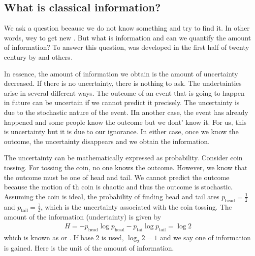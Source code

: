 \documentclass[letterpaper,10pt,english]{jupyterBook}
\begin{document}
\subsection{What is classical information?}
\label{\detokenize{computation/ccomp:what-is-classical-information}}
\sphinxAtStartPar
We  ask a question because we do not know something and try to find it.  In other words, wey to get new .  But what is information and can we quantify the amount of information?  To answer this question,  was developed in the first half of twenty century by  and others.

\sphinxAtStartPar
In essence,  the amount of information we obtain is the amount of uncertainty decreased.  If there is no uncertainty, there is nothing to ask.  The undertainties arise in several different ways.  The outcome of an event that is going to happen in future can be uncertain if we cannot predict it precisely.  The uncertainty is due to the stochastic nature of the event.  IIn another case, the event has already happened and some people know  the outcome but we dont’ know it.  For us, this is uncertainty but it is due to our ignorance.  In either case,  once we know the outcome, the uncertainty disappears and we obtain the information.

\sphinxAtStartPar
The uncertainty can be mathematically expressed as probability.  Consider coin tossing.  For tossing the coin, no one knows the outcome.  However, we know that the outcome must be one of head and tail.  We cannot predict the outcome because the motion of th coin is chaotic and thus the outcome is stochastic.  Assuming the coin is ideal, the probability of finding head and tail ares \(p_\text{head} = \frac{1}{2}\) and \(p_\text{tail}=\frac{1}{2}\), which is the uncertainty associated with the coin tossing.  The amount of the information (undertainty) is given by
\begin{equation*}
\begin{split}
H = - p_\text{head} \log p_\text{head} - p_\text{tai} \log p_\text{tail} = \log 2
\end{split}
\end{equation*}
\sphinxAtStartPar
which is known as  or .  If base 2 is used, \(\log_2 2 = 1\) and  we say one  of information is gained.  Here  is the unit of the amount of information.
\end{document}
